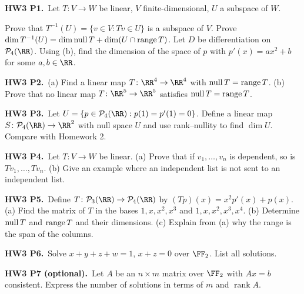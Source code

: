 \documentclass[10pt]{scrartcl}
\newcommand{\PP}{\mathcal P}\newcommand{\LL}{\mathcal L}\newcommand{\MM}{\mathcal M}
\begin{document}
\begin{prob}\textbf{HW3 P1.}\ Let $T\colon V\to W$ be linear, $V$ finite-dimensional, $U$ a subspace of $W$.
\begin{enumerate}[(a)]
  \ii Prove that $T^{-1}(U)=\{v\in V:Tv\in U\}$ is a subspace of $V$.
  \ii Prove $\dim T^{-1}(U)=\dim\operatorname{null} T+\dim(U\cap\operatorname{range} T)$.
  \ii Let $D$ be differentiation on $\PP_4(\RR)$. Using (b), find the dimension of the space of $p$ with $p'(x)=ax^2+b$ for some $a,b\in\RR$.
\end{enumerate}

\end{prob}
\begin{prob}\textbf{HW3 P2.}\ (a) Find a linear map $T\colon\RR^4\to\RR^4$ with $\operatorname{null} T=\operatorname{range} T$. (b) Prove that no linear map $T\colon\RR^5\to\RR^5$ satisfies $\operatorname{null} T=\operatorname{range} T$.


\end{prob}
\begin{prob}\textbf{HW3 P3.}\ Let $U=\{p\in\PP_4(\RR):p(1)=p'(1)=0\}$. Define a linear map $S\colon\PP_4(\RR)\to\RR^2$ with null space $U$ and use rank--nullity to find $\dim U$. Compare with Homework 2.


\end{prob}
\begin{prob}\textbf{HW3 P4.}\ Let $T\colon V\to W$ be linear. (a) Prove that if $v_1,\dots,v_n$ is dependent, so is $Tv_1,\dots,Tv_n$. (b) Give an example where an independent list is not sent to an independent list.


\end{prob}
\begin{prob}\textbf{HW3 P5.}\ Define $T\colon\PP_3(\RR)\to\PP_4(\RR)$ by $(Tp)(x)=x^2p'(x)+p(x)$. (a) Find the matrix of $T$ in the bases $1,x,x^2,x^3$ and $1,x,x^2,x^3,x^4$. (b) Determine $\operatorname{null} T$ and $\operatorname{range} T$ and their dimensions. (c) Explain from (a) why the range is the span of the columns.


\end{prob}
\begin{prob}\textbf{HW3 P6.}\ Solve $x+y+z+w=1$, $x+z=0$ over $\FF_2$. List all solutions.


\end{prob}
\begin{prob}\textbf{HW3 P7 (optional).}\ Let $A$ be an $n\times m$ matrix over $\FF_2$ with $Ax=b$ consistent. Express the number of solutions in terms of $m$ and $\operatorname{rank}A$.


\end{prob}
\end{document}
